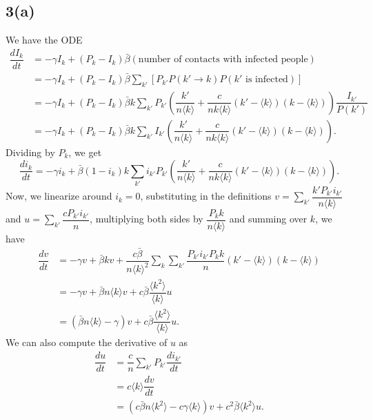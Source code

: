 \documentclass[]{article}
\begin{document}
	\subsection*{3(a)} We have the ODE
	\[
	\begin{aligned}
	\dfrac{d I_k}{dt} &= -\gamma I_k + (P_k - I_k)\bar{\beta}(\text{number of contacts with infected people})\\
	&= -\gamma I_k + (P_k - I_k)\bar{\beta}\sum\limits_{k'} [P_{k'} P(k'\to k)P(k'\text{ is infected})]\\
	&= -\gamma I_k + (P_k - I_k)\bar{\beta}k\sum\limits_{k'} P_{k'} \left( \dfrac{k'}{n\langle k \rangle} + \dfrac{c}{n k \langle k \rangle} (k' - \langle k \rangle)(k - \langle k \rangle)\right)\dfrac{I_{k'}}{P(k')}\\
	&= -\gamma I_k + (P_k - I_k)\bar{\beta}k\sum\limits_{k'} I_{k'} \left( \dfrac{k'}{n\langle k \rangle} + \dfrac{c}{n k \langle k \rangle} (k' - \langle k \rangle)(k - \langle k \rangle)\right).
	\end{aligned}
	\]
	Dividing by $P_k$, we get
	\[
	\dfrac{d i_k}{dt} = -\gamma i_k + \bar{\beta} (1 - i_k) k \sum\limits_{k'}i_{k'}P_{k'} \left( \dfrac{k'}{n\langle k \rangle} + \dfrac{c}{n k \langle k \rangle} (k' - \langle k \rangle)(k - \langle k \rangle)\right).
	\]
	Now, we linearize around $i_k = 0$, substituting in the definitions $v = \sum\limits_{k'} \dfrac{k' P_{k'} i_{k'}}{n\langle k \rangle}$ and $u = \sum\limits_{k'} \dfrac{c P_{k'} i_{k'}}{n}$, multiplying both sides by $\dfrac{P_k k}{n \langle k \rangle}$ and summing over $k$, we have
	\[
	\begin{aligned}
	\dfrac{d v}{dt} &= -\gamma v + \bar{\beta}  k v + \dfrac{c \bar{\beta}}{n\langle k \rangle^2}  \sum\limits_k\sum\limits_{k'} \dfrac{P_{k'} i_{k'} P_k k}{n} (k' - \langle k \rangle)(k - \langle k \rangle)\\
	&= -\gamma v + \bar{\beta} n \langle k \rangle v + c \bar{\beta}
	\dfrac{ \langle k^2 \rangle }{ \langle k \rangle} u\\
	&= (\bar{\beta} n \langle k \rangle - \gamma) v +  c \bar{\beta}
	\dfrac{ \langle k^2 \rangle }{ \langle k \rangle} u.
	\end{aligned}
	\]
	We can also compute the derivative of $u$ as 
	\[
	\begin{aligned}
	\dfrac{du}{dt} &= \dfrac{c}{n} \sum\limits_{k'} P_{k'} \dfrac{d i_{k'}}{dt}\\
	&= c \langle k \rangle \dfrac{dv}{dt}\\
	&= (c\bar{\beta} n \langle k^2 \rangle - c\gamma \langle k \rangle) v + c^2\bar{\beta}\langle k^2 \rangle u.
	\end{aligned}
	\]
\end{document}
